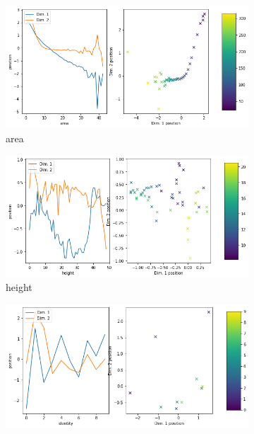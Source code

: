 \begin{figure}[H]
    \centering
    \begin{subfigure}{.48\textwidth}
        \includegraphics[width=\textwidth]{images/latent_space_traversals/vae_mnist_morpho_latent_space_values_area.png}
        \caption{area}
    \end{subfigure}
    \hfill
    \begin{subfigure}{.48\textwidth}
        \includegraphics[width=\textwidth]{images/latent_space_traversals/vae_mnist_morpho_latent_space_values_height.png}
        \caption{height}
    \end{subfigure}
    \begin{subfigure}{.48\textwidth}
        \includegraphics[width=\textwidth]{images/latent_space_traversals/vae_mnist_morpho_latent_space_values_identity.png}

\end{subfigure}
\end{figure}
